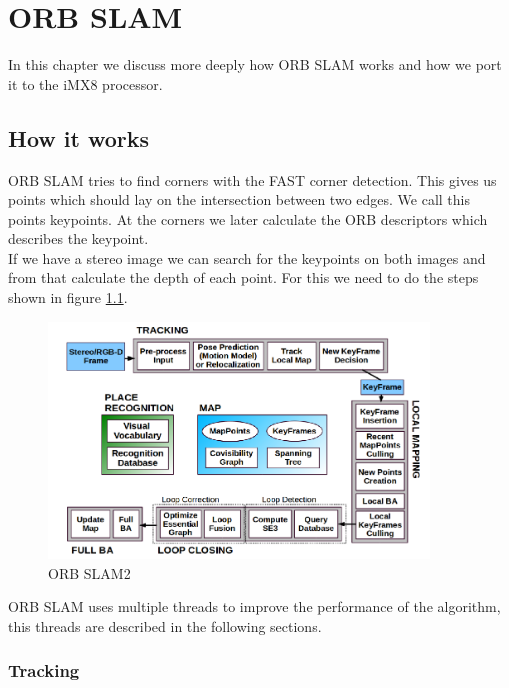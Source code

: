 \documentclass[11pt,a4paper,titlepage,oneside]{report}
\begin{document}
\chapter{ORB SLAM}\label{chap:implementation}

In this chapter we discuss more deeply how ORB SLAM works and how we port it to the iMX8 processor.

\section{How it works}
ORB SLAM tries to find corners with the FAST corner detection. This gives us points which should lay on the intersection between two edges. We call this points keypoints. At the corners we later calculate the ORB descriptors which describes the keypoint.\\
If we have a stereo image we can search for the keypoints on both images and from that calculate the depth of each point. For this we need to do the steps shown in figure \ref{fig:orb_slam2}.

\begin{figure}[H]
  \begin{center}
		\includegraphics[width=0.9\textwidth]{img/orb_slam2.png}
  \end{center}
	\caption{ORB SLAM2 \cite{orbslam2}}\label{fig:orb_slam2}
\end{figure}

ORB SLAM uses multiple threads to improve the performance of the algorithm, this threads are described in the following sections.

\subsection{Tracking}
\end{document}
